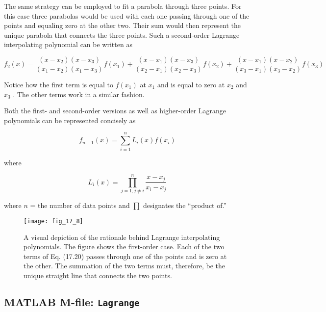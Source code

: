 \documentclass[../main.tex]{subfiles}
\begin{document}
The same strategy can be employed to fit a parabola through three points. For this case
three parabolas would be used with each one passing through one of the points and equaling zero at the other two. Their sum would then represent the unique parabola that connects
the three points. Such a second-order Lagrange interpolating polynomial can be written as

\begin{equation}
	\tag{17.21}
	f_2(x) = \frac{(x - x_2) (x - x_3)}{(x_1 - x_2)(x_1 - x_3)} f(x_1) + \frac{(x - x_1) (x - x_3)}{(x_2 - x_1) (x_2 - x_3)} f(x_2) + \frac{(x - x_1) (x - x_2)}{(x_3 - x_1) (x_3 - x_2)} f(x_3)
\end{equation}

\noindent Notice how the first term is equal to $f (x_1 )$ at $x_1$ and is equal to zero at $x_2$ and $x_3$ . The other
terms work in a similar fashion.

Both the first- and second-order versions as well as higher-order Lagrange polynomials can be represented concisely as

\begin{equation}
	\tag{17.22}
	f_{n-1}(x) = \sum ^ n _ {i=1} L_i (x) f(x_i)
\end{equation}

\noindent where

\begin{equation}
	\tag{17.23}
	L_i (x) = \prod ^n _{j=1, j \neq i} \frac{x - x_j}{x_i - x_j}
\end{equation}

\noindent where $n$ = the number of data points and $\prod$ designates the ``product of.''

\begin{figure}[H] 
	\centering
	\texttt{[image: fig\_17\_8]}
	\caption{\textsf{A visual depiction of the rationale behind Lagrange interpolating polynomials. The figure shows
	the first-order case. Each of the two terms of Eq. (17.20) passes through one of the points and
	is zero at the other. The summation of the two terms must, therefore, be the unique straight line
	that connects the two points.}}
	\label{fig:fig_17_8}
\end{figure}


\label{cha:cha_P_17_3_1} %
\subsection{MATLAB M-file: \texttt{Lagrange}}
\end{document}
